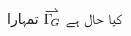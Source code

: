 \documentclass{minimal}
\newcommand{\tikzoverset}[2]{%
  \tikz[baseline=(X.base),inner sep=0pt,outer sep=0pt]{%
    \node[inner sep=0pt,outer sep=0pt] (X) {$#2$}; 
    \node[yshift=1pt] at (X.north) {$#1$};
}}
\begin{document}
کیا حال ہے
$\tikzoverset{\rightharpoonup}{\Gamma_{\!G}}$
تمہارا
\end{document}

